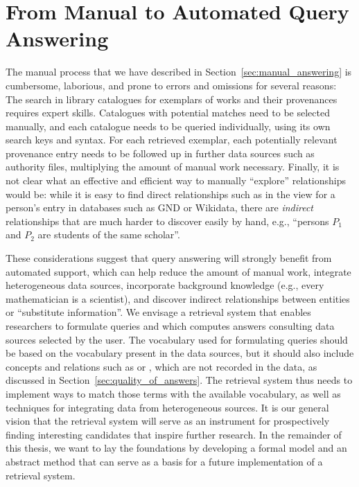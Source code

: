 \section{From Manual to Automated Query Answering}
\label{sec:manual_vs_automated}

The manual process that we have described in Section~\ref{sec:manual_answering}
is cumbersome, laborious, and prone to errors and omissions for several reasons:
The search in library catalogues for exemplars of works and their provenances requires expert skills.
Catalogues with potential matches need to be selected manually,
and each catalogue needs to be queried individually, using its own search keys and syntax. 
For each retrieved exemplar, each potentially relevant provenance entry 
needs to be followed up in further data sources such as authority files,
multiplying the amount of manual work necessary.
Finally, it is not clear what an effective and efficient way to manually \enquote{explore}
relationships would be:
while it is easy to find direct relationships such as  in the view for a person's entry
in databases such as \gls{GND} or Wikidata, there are \emph{indirect} relationships
that are much harder to discover easily by hand,
e.g., \enquote{persons $P_1$ and $P_2$ are students of the same scholar}.

These considerations suggest that query answering will
strongly benefit from automated support,
which can help reduce the amount of manual work, integrate heterogeneous data sources,
incorporate background knowledge (e.g., every mathematician is a scientist),
and discover indirect relationships between entities or \enquote{substitute information}.
We envisage a retrieval system that enables researchers to formulate queries 
and which computes answers consulting data sources selected by the user.
The vocabulary used for formulating queries should be based on the vocabulary
present in the data sources, but it should also include concepts and relations
such as  or ,
which are not recorded in the data, as discussed in
Section~\ref{sec:quality_of_answers}. The retrieval system thus needs to implement ways
to match those terms with the available vocabulary, as well as techniques
for integrating data from heterogeneous sources.
It is our general vision that the retrieval system will serve as an instrument for prospectively finding interesting
candidates that inspire further research.
In the remainder of this thesis, we want to lay the foundations by developing
a formal model and an abstract method
that can serve as a basis for a future implementation of a retrieval system.

